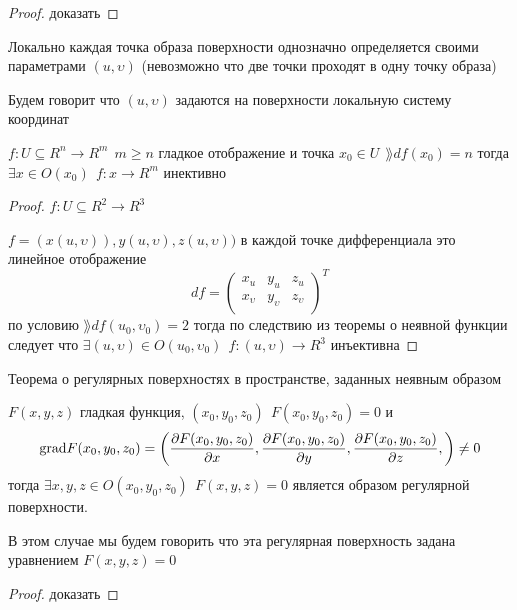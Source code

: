 \begin{proof}
  доказать
\end{proof}

\begin{block}[Следствие]
  Локально каждая точка образа поверхности однозначно определяется своими
  параметрами $(u, \upsilon)$ (невозможно что две точки проходят в одну точку
  образа)

  Будем говорит что $(u, \upsilon)$ задаются на поверхности локальную систему
  координат
\end{block}

\begin{theorem}
  $f: U \subseteq R^n \to R^m ~~ m \ge n$ гладкое отображение и точка
  $x_0 \in U ~~ \rang df(x_0) = n$ тогда $\exists x \in O(x_0) ~~
  f: x \to R^m$ инективно
\end{theorem}

\begin{proof}
  $f: U \subseteq R^2 \to R^3$

  $f = (x(u, \upsilon)), y(u, \upsilon), z(u, \upsilon))$ в каждой точке
  дифференциала это линейное отображение
  $$
  df =
  \left(
  \begin{array}{ccc}
    x_u & y_u & z_u \\
    x_{\upsilon} & y_{\upsilon} & z_{\upsilon} \\
  \end{array}
  \right)^T
  $$
  по условию $\rang df(u_0, \upsilon_0) = 2$ тогда по следствию из теоремы о
  неявной функции следует что $\exists (u, \upsilon) \in O(u_0, \upsilon_0) ~~
  f: (u, \upsilon) \to R^3$ инъективна
\end{proof}

\begin{title}[\Large]
  Теорема о регулярных поверхностях в пространстве, заданных неявным образом
\end{title}

\begin{theorem}
  $F(x,y,z)$ гладкая функция, $(x_0, y_0, z_0) ~~ F(x_0, y_0, z_0) = 0$ и
  $$
  \mathrm{grad} F(x_0, y_0, z_0) = \left(
  \frac{\partial F(x_0, y_0, z_0)}{\partial x},
  \frac{\partial F(x_0, y_0, z_0)}{\partial y},
  \frac{\partial F(x_0, y_0, z_0)}{\partial z},
  \right) \not= 0
  $$
  тогда $\exists x,y,z \in O(x_0, y_0, z_0) ~~ F(x, y, z) = 0$ является образом
  регулярной поверхности.

  В этом случае мы будем говорить что эта регулярная поверхность задана
  уравнением $F(x, y, z) = 0$
\end{theorem}

\begin{proof}
  доказать
\end{proof}